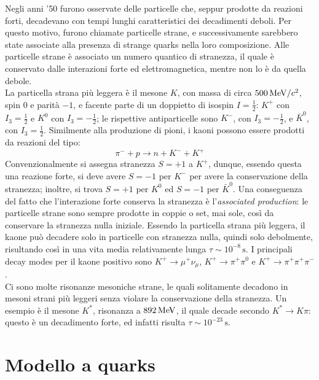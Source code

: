 Negli anni '50 furono osservate delle particelle che, seppur prodotte da reazioni forti, decadevano con tempi lunghi caratteristici dei decadimenti deboli. Per questo motivo, furono chiamate particelle strane, e successivamente sarebbero state associate alla presenza di strange quarks nella loro composizione.
Alle particelle strane è associato un numero quantico di stranezza, il quale è conservato dalle interazioni forte ed elettromagnetica, mentre non lo è da quella debole.\\
La particella strana più leggera è il mesone $ K $, con massa di circa $ 500\,\mathrm{MeV}/c^2 $, spin 0 e parità $ -1 $, e facente parte di un doppietto di isospin $ I = \frac{1}{2} $: $ K^+ $ con $ I_3 = \frac{1}{2} $ e $ K^0 $ con $ I_3 = -\frac{1}{2} $; le rispettive antiparticelle sono $ K^- $, con $ I_3 = -\frac{1}{2} $, e $ \bar{K}^0 $, con $ I_3 = \frac{1}{2} $. Similmente alla produzione di pioni, i kaoni possono essere prodotti da reazioni del tipo:
\begin{equation*}
	\pi^- + p \rightarrow n + K^- + K^+
\end{equation*}
Convenzionalmente si assegna stranezza $ S = +1 $ a $ K^+ $, dunque, essendo questa una reazione forte, si deve avere $ S = -1 $ per $ K^- $ per avere la conservazione della stranezza; inoltre, si trova $ S = +1 $ per $ K^0 $ ed $ S = -1 $ per $ \bar{K}^0 $. Una conseguenza del fatto che l'interazione forte conserva la stranezza è l'\textit{associated production}: le particelle strane sono sempre prodotte in coppie o set, mai sole, così da conservare la stranezza nulla iniziale. Essendo la particella strana più leggera, il kaone può decadere solo in particelle con stranezza nulla, quindi solo debolmente, risultando così in una vita media relativamente lunga $ \tau \sim 10^{-8}\,\text{s} $. I principali decay modes per il kaone positivo sono $ K^+ \rightarrow \mu^+ \nu_{\mu} $, $ K^+ \rightarrow \pi^+ \pi^0 $ e $ K^+ \rightarrow \pi^+ \pi^+ \pi^- $.\\
Ci sono molte risonanze mesoniche strane, le quali solitamente decadono in mesoni strani più leggeri senza violare la conservazione della stranezza. Un esempio è il mesone $ K^* $, risonanza a $ 892\,\mathrm{MeV} $, il quale decade secondo $ K^* \rightarrow K \pi $: questo è un decadimento forte, ed infatti risulta $ \tau \sim 10^{-23}\,\text{s} $.

\section{Modello a quarks}


